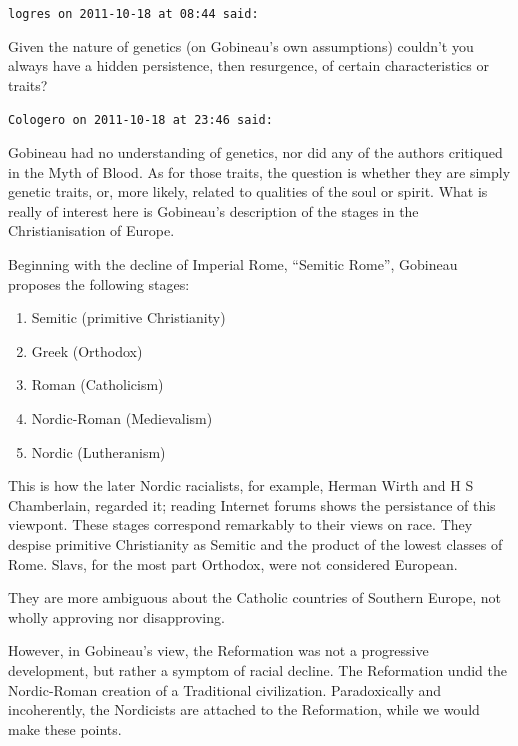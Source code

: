 \begin{footnotesize}
\begin{sffamily}
\texttt{logres on 2011-10-18 at 08:44 said:}

Given the nature of genetics (on Gobineau's own assumptions) couldn't you always have a hidden persistence, then resurgence, of certain characteristics or traits?

\hfill

\texttt{Cologero on 2011-10-18 at 23:46 said:}

Gobineau had no understanding of genetics, nor did any of the authors critiqued in the Myth of Blood. As for those traits, the question is whether they are simply genetic traits, or, more likely, related to qualities of the soul or spirit. What is really of interest here is Gobineau's description of the stages in the Christianisation of Europe.

Beginning with the decline of Imperial Rome, ``Semitic Rome'', Gobineau proposes the following stages:

\begin{enumerate}

\def\labelenumi{\Roman{enumi}.}
\item Semitic (primitive Christianity)

\item Greek (Orthodox)

\item Roman (Catholicism)

\item Nordic-Roman (Medievalism)

\item Nordic (Lutheranism)
\end{enumerate}


This is how the later Nordic racialists, for example, Herman Wirth and H S Chamberlain, regarded it; reading Internet forums shows the persistance of this viewpont. These stages correspond remarkably to their views on race. They despise primitive Christianity as Semitic and the product of the lowest classes of Rome. Slavs, for the most part Orthodox, were not considered European.

They are more ambiguous about the Catholic countries of Southern Europe, not wholly approving nor disapproving.

However, in Gobineau's view, the Reformation was not a progressive development, but rather a symptom of racial decline. The Reformation undid the Nordic-Roman creation of a Traditional civilization. Paradoxically and incoherently, the Nordicists are attached to the Reformation, while we would make these points.


\end{sffamily}
\end{footnotesize}
